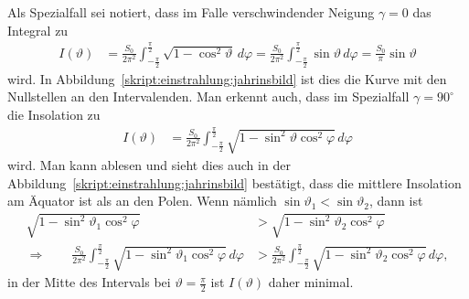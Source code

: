 Als Spezialfall sei notiert, dass im Falle verschwindender Neigung
$\gamma=0$ das Integral zu
\begin{align*}
I(\vartheta)
&=
\frac{S_0}{2\pi^2}
\int_{-\frac{\pi}2}^{\frac{\pi}2}
\sqrt{1-\cos^2\vartheta}
\,d\varphi
=
\frac{S_0}{2\pi^2}
\int_{-\frac{\pi}2}^{\frac{\pi}2}
\sin\vartheta
\,d\varphi
=
\frac{S_0}{\pi}
\sin\vartheta
\end{align*}
wird.
In Abbildung~\ref{skript:einstrahlung:jahrinsbild} ist dies die
Kurve mit den Nullstellen an den Intervalenden.
Man erkennt auch, dass im Spezialfall $\gamma=90^\circ$ die Insolation zu
\begin{align*}
I(\vartheta)
&=
\frac{S_0}{2\pi^2}
\int_{-\frac{\pi}2}^{\frac{\pi}2}
\sqrt{1- \sin^2\vartheta\cos^2\varphi}
\,d\varphi
\end{align*}
wird.
Man kann ablesen und sieht dies auch in der 
Abbildung~\ref{skript:einstrahlung:jahrinsbild} bestätigt, dass
die mittlere Insolation am Äquator ist als an den Polen.
Wenn nämlich $\sin\vartheta_1 < \sin\vartheta_2$, dann ist
\begin{align*}
\sqrt{1- \sin^2\vartheta_1\cos^2\varphi}
&>
\sqrt{1- \sin^2\vartheta_2\cos^2\varphi}
\\
\Rightarrow
\qquad
\frac{S_0}{2\pi^2}
\int_{-\frac{\pi}2}^{\frac{\pi}2}
\sqrt{1- \sin^2\vartheta_1\cos^2\varphi}
\,d\varphi
&>
\frac{S_0}{2\pi^2}
\int_{-\frac{\pi}2}^{\frac{\pi}2}
\sqrt{1- \sin^2\vartheta_2\cos^2\varphi}
\,d\varphi,
\end{align*}
in der Mitte des Intervals bei $\vartheta=\frac{\pi}2$ ist $I(\vartheta)$
daher minimal.

